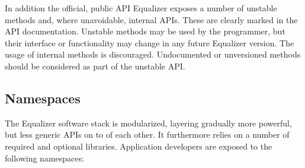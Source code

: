 \documentclass[10pt,a4]{scrartcl}
\begin{document}
In addition the official, public API Equalizer exposes a number of
unstable methods and, where unavoidable, internal APIs. These are clearly marked
in the API documentation. Unstable methods may be used by the programmer, but
their interface or functionality may change in any future Equalizer version. The
usage of internal methods is discouraged. Undocumented or unversioned methods
should be considered as part of the unstable API.

\subsection{\label{sNamespaces}Namespaces}

The Equalizer software stack is modularized, layering gradually more powerful,
but less generic APIs on to of each other. It furthermore relies on a number of
required and optional libraries. Application developers are exposed to the
following name\-spa\-ces:
\end{document}
